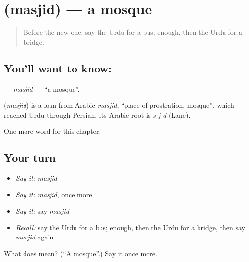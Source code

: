 \section[\texorpdfstring{\ur{مسجد} (masjid)}{مسجد (masjid)}]{ (masjid) — a mosque}

\label{lesson:UR-C80-masjid}



\begin{quote}
Before the new one: say the Urdu for a bus; enough, then the Urdu for a bridge.
\end{quote}

\subsection*{You'll want to know: }
\textbf{} — \emph{masjid} — \textquotedblleft{}a mosque\textquotedblright{}.

\begin{cousinweb}
\textbf{} (\emph{masjid}) is a loan from Arabic \emph{masjid}, \textquotedblleft{}place of prostration, mosque\textquotedblright{}, which reached Urdu through Persian. Its Arabic root is \emph{s-j-d} (Lane).
\end{cousinweb}

\begin{grammarlens}[title={What you've built}]
One more word for this chapter.
\end{grammarlens}

\subsection*{Your turn}
\begin{itemize}
\raggedright
  \item \emph{Say it:} \emph{masjid}
  \item \emph{Say it:} \emph{masjid}, once more
  \item \emph{Say it:} say \emph{masjid}
  \item \emph{Recall:} say the Urdu for a bus; enough, then the Urdu for a bridge, then say \emph{masjid} again
\end{itemize}

\begin{tcolorbox}[breakable,colback=teal!4,colframe=teal!35!black,title={Before you move on}]
What does  mean? (\textquotedblleft{}A mosque\textquotedblright{}.) Say it once more.
\end{tcolorbox}
